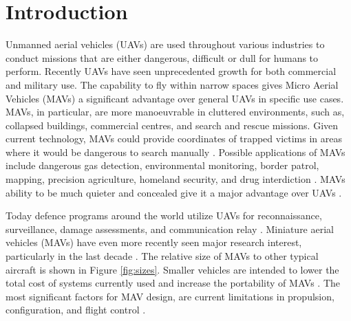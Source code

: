 \graphicspath{{./Figs/}}

\chapter{Introduction} 
\label{sec:Background}




Unmanned aerial vehicles (UAVs) are used throughout various industries to conduct missions that are either dangerous, difficult or dull for humans to perform. Recently UAVs have seen unprecedented growth for both commercial \cite{Liu2014} and military \cite{Chaturvedi2019, Fan2018} use. The capability to fly within narrow spaces gives Micro Aerial Vehicles (MAVs) a significant advantage over general UAVs in specific use cases. MAVs, in particular, are more manoeuvrable in cluttered environments, such as, collapsed buildings, commercial centres, and search and rescue missions. Given current technology, MAVs could provide coordinates of trapped victims in areas where it would be dangerous to search manually \cite{Valavanis2007}. Possible applications of MAVs include dangerous gas detection, environmental monitoring, border patrol, mapping, precision agriculture, homeland security, and drug interdiction \cite{Liu2014, Valavanis2007}. MAVs ability to be much quieter and concealed give it a major advantage over UAVs \cite{Chaturvedi2019}.


Today defence programs around the world utilize UAVs for reconnaissance, surveillance, damage assessments, and communication relay \cite{Chaturvedi2019, Fan2018, Valavanis2007}. Miniature aerial vehicles (MAVs) have even more recently seen major research interest, particularly in the last decade \cite{Valavanis2007}.  The relative size of MAVs to other typical aircraft is shown in Figure \ref{fig:sizes}. Smaller vehicles are intended to lower the total cost of systems currently used and increase the portability of MAVs \cite{Stephen2022}. The most significant factors for MAV design, are current limitations in propulsion, configuration, and flight control \cite{Stephen2022}.


